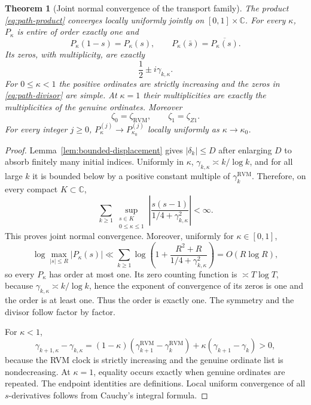 \documentclass[11pt,reqno]{amsart}
\newtheorem{theorem}{Theorem}[section]
\theoremstyle{definition}
\theoremstyle{remark}
\newcommand{\C}{\mathbb C}
\newcommand{\RVM}{\mathrm{RVM}}
\begin{document}
\begin{theorem}[Joint normal convergence of the transport family]\label{thm:path}
The product \eqref{eq:path-product} converges locally uniformly jointly on $[0,1]\times\C$.  For every $\kappa$, $P_\kappa$ is entire of order exactly one and
\begin{equation}
 P_\kappa(1-s)=P_\kappa(s),
 \qquad
 P_\kappa(\bar s)=\overline{P_\kappa(s)}.
\end{equation}
Its zeros, with multiplicity, are exactly
\begin{equation}\label{eq:path-divisor}
 \frac12\pm i\gamma_{k,\kappa}.
\end{equation}
For $0\le\kappa<1$ the positive ordinates are strictly increasing and the zeros in \eqref{eq:path-divisor} are simple.  At $\kappa=1$ their multiplicities are exactly the multiplicities of the genuine ordinates.  Moreover
\begin{equation}\label{eq:path-endpoints}
 \boxed{
 \zeta_0=\zeta_{\RVM},
 \qquad
 \zeta_1=\zeta_{Z1}.}
\end{equation}
For every integer $j\ge0$, $P_\kappa^{(j)}\to P_{\kappa_0}^{(j)}$ locally uniformly as $\kappa\to\kappa_0$.
\end{theorem}

\begin{proof}
Lemma~\ref{lem:bounded-displacement} gives $|\delta_k|\le D$ after enlarging $D$ to absorb finitely many initial indices.  Uniformly in $\kappa$,
$\gamma_{k,\kappa}\asymp k/\log k$, and for all large $k$ it is bounded below by a positive constant multiple of $\gamma_k^{\RVM}$.  Therefore, on every compact $K\subset\C$,
\[
 \sum_{k\ge1}
 \sup_{\substack{s\in K\\0\le\kappa\le1}}
 \left|\frac{s(s-1)}{1/4+\gamma_{k,\kappa}^2}\right|
 <\infty.
\]
This proves joint normal convergence.  Moreover, uniformly for $\kappa\in[0,1]$,
\[
 \log\max_{|s|\le R}|P_\kappa(s)|
 \ll \sum_{k\ge1}\log\left(1+\frac{R^2+R}{1/4+\gamma_{k,\kappa}^2}\right)
 =O(R\log R),
\]
so every $P_\kappa$ has order at most one.  Its zero counting function is $\asymp T\log T$, because $\gamma_{k,\kappa}\asymp k/\log k$, hence the exponent of convergence of its zeros is one and the order is at least one.  Thus the order is exactly one.  The symmetry and the divisor follow factor by factor.

For $\kappa<1$,
\[
 \gamma_{k+1,\kappa}-\gamma_{k,\kappa}
 =(1-\kappa)(\gamma_{k+1}^{\RVM}-\gamma_k^{\RVM})
 +\kappa(\gamma_{k+1}-\gamma_k)>0,
\]
because the RVM clock is strictly increasing and the genuine ordinate list is nondecreasing.  At $\kappa=1$, equality occurs exactly when genuine ordinates are repeated.  The endpoint identities are definitions.  Local uniform convergence of all $s$-derivatives follows from Cauchy's integral formula.
\end{proof}
\end{document}
